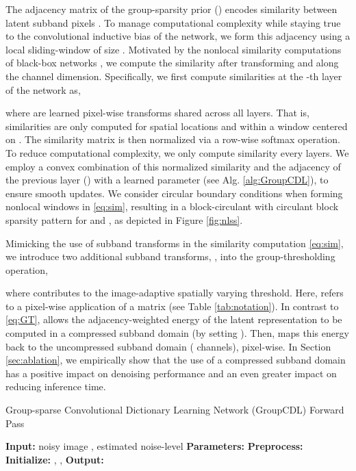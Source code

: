\documentclass[lettersize,journal]{IEEEtran}
\begin{document}
The adjacency matrix of the group-sparsity prior () encodes
similarity between latent subband pixels .
To manage computational complexity while staying true to the
convolutional inductive bias of the network, we form this adjacency using a local
sliding-window of size .
Motivated by the nonlocal similarity computations of black-box networks
\cite{liu2018non}, we compute the similarity after transforming  and
 along the channel dimension. 
Specifically, we first compute similarities at the -th layer of the network as,

where
 are learned pixel-wise transforms shared across all layers. 
That is, similarities  are only computed for spatial locations  and  within a  window centered on .
The similarity matrix is then normalized via a row-wise softmax
operation. To reduce computational complexity, we only compute similarity every
 layers. 
We employ a convex combination of this normalized similarity and the adjacency
of the previous layer () with a learned
parameter  (see Alg. \ref{alg:GroupCDL}), to ensure smooth updates.
We consider circular boundary conditions when forming nonlocal windows in
\eqref{eq:sim}, resulting in a block-circulant with circulant block sparsity
pattern for  and , as depicted in Figure \ref{fig:nlss}. 

Mimicking the use of subband transforms in the similarity computation
\eqref{eq:sim}, we introduce two additional subband transforms, 
, into the
group-thresholding operation,

where  contributes to the image-adaptive spatially varying threshold. Here,  refers to a pixel-wise application of a matrix  (see Table \ref{tab:notation}).
In contrast to \eqref{eq:GT},  allows the adjacency-weighted energy of the latent representation to be computed in a compressed subband domain (by setting ). Then, 
maps this energy back to the uncompressed subband domain ( channels), pixel-wise.
In Section \ref{sec:ablation}, we empirically show that the use of a compressed
subband domain has a positive impact on denoising performance and an even
greater impact on reducing inference time. 

\begin{algorithm2e}[tb]
\caption{Group-sparse Convolutional Dictionary Learning Network (GroupCDL) Forward Pass}
\label{alg:GroupCDL}
\begin{small}
\textbf{Input:} noisy image , estimated noise-level  \;
\textbf{Parameters:}  \;
\textbf{Preprocess:}  \;
\textbf{Initialize:} , ,   \;
\textbf{Output:}  \;
\end{small}
\end{algorithm2e}
\end{document}
